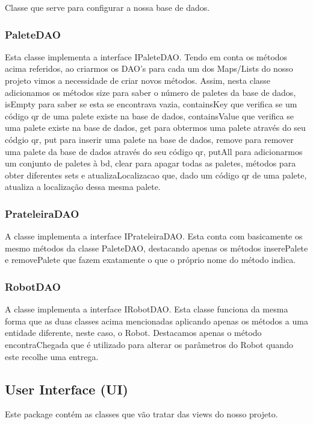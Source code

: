 \documentclass[11pt]{article}
\begin{document}
Classe que serve para configurar a nossa base de dados.

\subsubsection{PaleteDAO}

Esta classe implementa a interface IPaleteDAO. Tendo em conta os métodos acima referidos, ao criarmos os DAO's para cada um dos Maps/Lists do nosso projeto vimos a necessidade de criar novos métodos. Assim, nesta classe adicionamos os métodos size para saber o número de paletes da base de dados, isEmpty para saber se esta se encontrava vazia, containsKey que verifica se um código qr de uma palete existe na base de dados, containsValue que verifica se uma palete existe na base de dados, get para obtermos uma palete através do seu códgio qr, put para inserir uma palete na base de dados, remove para remover uma palete da base de dados através do seu código qr, putAll para adicionarmos um conjunto de paletes à bd, clear para apagar todas as paletes, métodos para obter diferentes sets e atualizaLocalizacao que, dado um código qr de uma palete, atualiza a localização dessa mesma palete.

\subsubsection{PrateleiraDAO}

A classe implementa a interface IPrateleiraDAO. Esta conta com basicamente os mesmo métodos da classe PaleteDAO, destacando apenas os métodos inserePalete e removePalete que fazem exatamente o que o próprio nome do método indica.

\subsubsection{RobotDAO}

A classe implementa a interface IRobotDAO. Esta classe funciona da mesma forma que as duas classes acima mencionadas aplicando apenas os métodos a uma entidade diferente, neste caso, o Robot. Destacamos apenas o método encontraChegada que é utilizado para alterar os parâmetros do Robot quando este recolhe uma entrega. 

\subsection{User Interface (UI)}

Este package contém as classes que vão tratar das views do nosso projeto.
\end{document}
